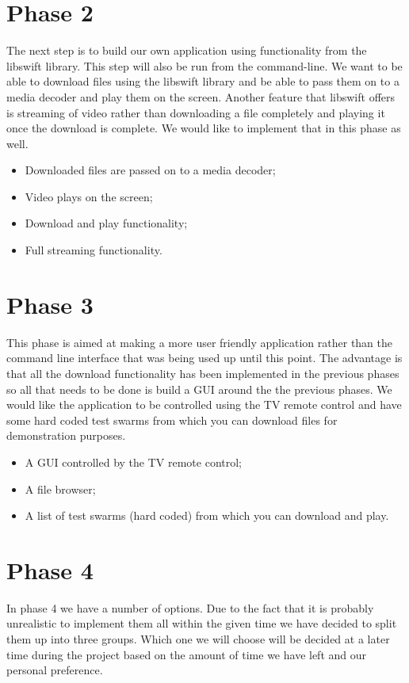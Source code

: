 \section{Phase 2}
The next step is to build our own application using functionality from the libswift library. 
This step will also be run from the command-line. 
We want to be able to download files using the libswift library and 
be able to pass them on to a media decoder and play them on the screen. 
Another feature that libswift offers is streaming of video rather than 
downloading a file completely and playing it once the download is complete. 
We would like to implement that in this phase as well.

\begin{itemize}
\item Downloaded files are passed on to a media decoder;
\item Video plays on the screen;
\item Download and play functionality;
\item Full streaming functionality.
\end{itemize}

\section{Phase 3}
This phase is aimed at making a more user friendly application rather than 
the command line interface that was being used up until this point. 
The advantage is that all the download functionality has been implemented in the 
previous phases so all that needs to be done is build a GUI around the the previous phases. 
We would like the application to be controlled using the TV remote control and 
have some hard coded test swarms from which you can download files for demonstration purposes.

\begin{itemize}
\item A GUI controlled by the TV remote control;
\item A file browser;
\item A list of test swarms (hard coded) from which you can download and play.
\end{itemize}

\section{Phase 4}
In phase 4 we have a number of options. 
Due to the fact that it is probably unrealistic to implement them all within the given time we have decided to split 
them up into three groups. 
Which one we will choose will be decided at a later time during the project based 
on the amount of time we have left and our personal preference.

